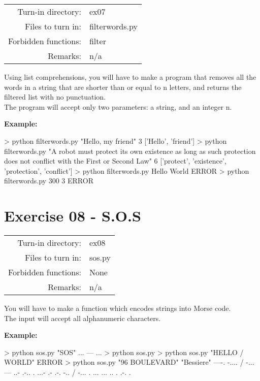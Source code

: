 \documentclass[]{article}
\newenvironment{Shaded}{\begin{snugshade}}{\end{snugshade}}
\newcommand{\NormalTok}[1]{\textcolor[rgb]{0.81,0.81,0.76}{#1}}
\begin{document}
\begin{longtable}[]{@{}rl@{}}
\toprule
\endhead
Turn-in directory: & ex07\tabularnewline
Files to turn in: & filterwords.py\tabularnewline
Forbidden functions: & filter\tabularnewline
Remarks: & n/a\tabularnewline
\bottomrule
\end{longtable}

Using list comprehensions, you will have to make a program that removes
all the words in a string that are shorter than or equal to n letters,
and returns the filtered list with no punctuation.\\
The program will accept only two parameters: a string, and an integer n.

\textbf{Example:}

\begin{Shaded}
\begin{Highlighting}[]
\NormalTok{> python filterwords.py "Hello, my friend" 3}
\NormalTok{['Hello', 'friend']}
\NormalTok{>  python filterwords.py "A robot must protect its own existence as long as such protection does not conflict with the First or Second Law" 6}
\NormalTok{['protect', 'existence', 'protection', 'conflict']}
\NormalTok{> python filterwords.py Hello World}
\NormalTok{ERROR}
\NormalTok{> python filterwords.py 300 3}
\NormalTok{ERROR}
\end{Highlighting}
\end{Shaded}

\clearpage

\hypertarget{exercise-08---s.o.s-1}{%
\section{Exercise 08 - S.O.S}\label{exercise-08---s.o.s-1}}

\begin{longtable}[]{@{}rl@{}}
\toprule
\endhead
Turn-in directory: & ex08\tabularnewline
Files to turn in: & sos.py\tabularnewline
Forbidden functions: & None\tabularnewline
Remarks: & n/a\tabularnewline
\bottomrule
\end{longtable}

You will have to make a function which encodes strings into Morse
code.\\
The input will accept all alphanumeric characters.

\textbf{Example:}

\begin{Shaded}
\begin{Highlighting}[]
\NormalTok{> python sos.py "SOS"}
\NormalTok{... --- ...}
\NormalTok{> python sos.py}
\NormalTok{> python sos.py "HELLO / WORLD"}
\NormalTok{ERROR}
\NormalTok{> python sos.py "96 BOULEVARD" "Bessiere"}
\NormalTok{----. -.... / -... --- ..- .-.. . ...- .- .-. -.. / -... . ... ... .. . .-. .}
\end{Highlighting}
\end{Shaded}
\end{document}

